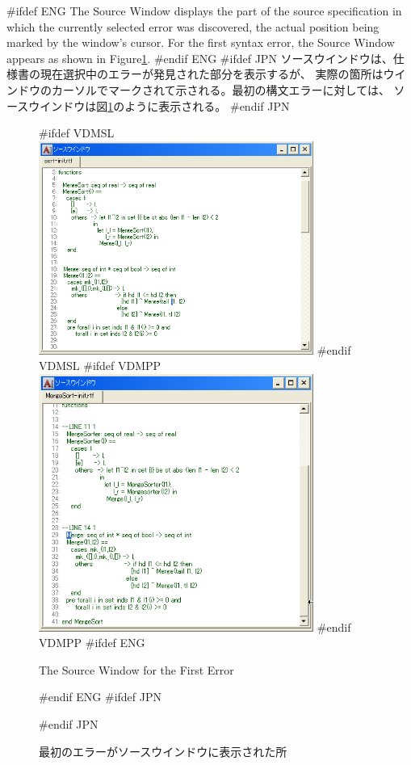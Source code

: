 \documentclass[\pformat,12pt]{article}
\newcommand{\guicmd}[1]{{\sf #1}}
\newcommand{\guicmd}[1]{{\gt #1}}
\begin{document}
#ifdef ENG
The \guicmd{Source Window} displays the part of the source
specification in which the currently selected error was discovered,
the actual position being marked by the window's cursor. For the first
syntax error, the \guicmd{Source Window} appears as shown in
Figure\ref{fig:source1}.
#endif ENG
#ifdef JPN
\guicmd{ソースウインドウ}は、仕様書の現在選択中のエラーが発見された部分を表示するが、
実際の箇所はウインドウのカーソルでマークされて示される。最初の構文エラーに対しては、
\guicmd{ソースウインドウ}は図\ref{fig:source1}のように表示される。
#endif JPN

\begin{figure}[tbh]
\begin{center}
#ifdef VDMSL
\includegraphics[width=9cm]{sourceWindow-sl.png}
#endif VDMSL
#ifdef VDMPP
\includegraphics[width=9cm]{sourceWindow-pp.png}
#endif VDMPP
#ifdef ENG
\caption{The Source Window for the First Error}
#endif ENG
#ifdef JPN
\caption{最初のエラーがソースウインドウに表示された所}
#endif JPN
\label{fig:source1}
\end{center}
\end{figure}
\end{document}
